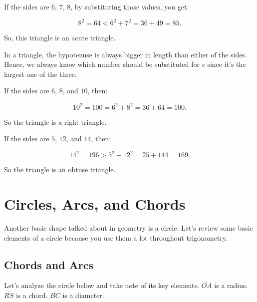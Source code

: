 \begin{example}
  \label{exm:type_of_triangle}

  If the sides are $6$, $7$, $8$, by substituting those values, you get:

  \[ 8^{2} = 64 < 6^{2} + 7^{2} = 36 + 49 = 85 . \]

  So, this triangle is an acute triangle.
\end{example}

\begin{note}
  \label{not:which_number_is_the_hypotenuse}

  In a triangle, the hypotenuse is always bigger in length than either of the
  sides. Hence, we always know which number should be substituted for $c$ since
  it's the largest one of the three.

  If the sides are $6$, $8$, and $10$, then:

  \[ 10^{2} = 100 = 6^{2} + 8^{2} = 36 + 64 = 100 . \]

  So the triangle is a right triangle.

  If the sides are $5$, $12$, and $14$, then:

  \[ 14^{2} = 196 > 5^{2} + 12^{2} = 25 + 144 = 169 . \]

  So the triangle is an obtuse triangle.
\end{note}



\section{Circles, Arcs, and Chords}
\label{sec:circles_arcs_and_chords}

Another basic shape talked about in geometry is a circle. Let's review some
basic elements of a circle because you use them a lot throughout trigonometry.

\subsection{Chords and Arcs}
\label{sub_sec:chords_and_arcs}

Let's analyze the circle below and take note of its key elements.
$\overline{OA}$ is a radius. $\overline{RS}$ is a chord. $\overline{BC}$ is a
diameter.

\newpage

